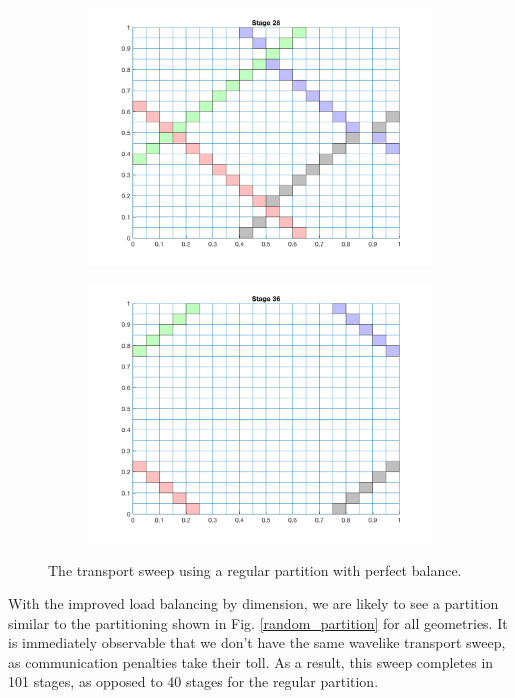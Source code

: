\documentclass[letterpaper]{mandc2019}
\begin{document}
\begin{figure}[H]
\begin{subfigure}{0.49\textwidth}
  \includegraphics[scale=0.5]{figures/regular_partition_3.png}
  \end{subfigure}
  \begin{subfigure}{0.49\textwidth}
  \includegraphics[scale=0.5]{figures/regular_partition_4.png}
  \end{subfigure}
  \caption{The transport sweep using a regular partition with perfect balance.}
  \label{regular_partition}
\end{figure}

With the improved load balancing by dimension, we are likely to see a partition similar to the partitioning shown in Fig. \ref{random_partition} for all geometries. It is immediately observable that we don't have the same wavelike transport sweep, as communication penalties take their toll. As a result, this sweep completes in 101 stages, as opposed to 40 stages for the regular partition.
\end{document}
